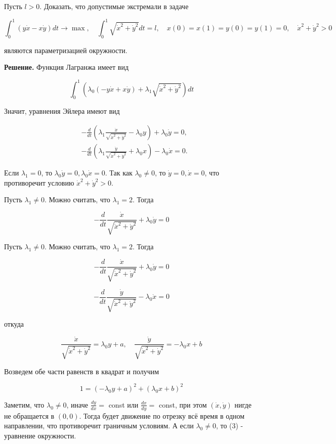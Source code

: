 \begin{task}
Пусть $l>0$. Доказать, что допустимые экстремали в задаче

$$
\int_{0}^{1}(y \dot{x}-x \dot{y}) d t \rightarrow \max , \quad \int_{0}^{1} \sqrt{\dot{x}^{2}+\dot{y}^{2}} d t=l, \quad x(0)=x(1)=y(0)=y(1)=0, \quad \dot{x}^{2}+\dot{y}^{2}>0
$$

являются параметризацией окружности.

\textbf{Решение.} Функция Лагранжа имеет вид

$$
\int_{0}^{1}\left(\lambda_{0}(-y \dot{x}+x \dot{y})+\lambda_{1} \sqrt{\dot{x}^{2}+\dot{y}^{2}}\right) d t
$$

Значит, уравнения Эйлера имеют вид

$$
\begin{aligned}
& -\frac{d}{d t}\left(\lambda_{1} \frac{\dot{x}}{\sqrt{\dot{x}^{2}+\dot{y}^{2}}}-\lambda_{0} y\right)+\lambda_{0} \dot{y}=0, \\
& -\frac{d}{d t}\left(\lambda_{1} \frac{\dot{y}}{\sqrt{\dot{x}^{2}+\dot{y}^{2}}}+\lambda_{0} x\right)-\lambda_{0} \dot{x}=0 .
\end{aligned}
$$

Если $\lambda_{1}=0$, то $\lambda_{0} \dot{y}=0, \lambda_{0} \dot{x}=0$. Так как $\lambda_{0} \neq 0$, то $\dot{y}=0, \dot{x}=0$, что противоречит условию $\dot{x}^{2}+\dot{y}^{2}>0$.

Пусть $\lambda_{1} \neq 0$. Можно считать, что $\lambda_{1}=2$. Тогда

$$
-\frac{d}{d t} \frac{\dot{x}}{\sqrt{\dot{x}^{2}+\dot{y}^{2}}}+\lambda_{0} \dot{y}=0
$$

Пусть $\lambda_{1} \neq 0$. Можно считать, что $\lambda_{1}=2$. Тогда

$$
-\frac{d}{d t} \frac{\dot{x}}{\sqrt{\dot{x}^{2}+\dot{y}^{2}}}+\lambda_{0} \dot{y}=0
$$

$$
-\frac{d}{d t} \frac{\dot{y}}{\sqrt{\dot{x}^{2}+\dot{y}^{2}}}-\lambda_{0} \dot{x}=0
$$

откуда

$$
\frac{\dot{x}}{\sqrt{\dot{x}^{2}+\dot{y}^{2}}}=\lambda_{0} y+a, \quad \frac{\dot{y}}{\sqrt{\dot{x}^{2}+\dot{y}^{2}}}=-\lambda_{0} x+b
$$

Возведем обе части равенств в квадрат и получим

$$
1=\left(-\lambda_{0} y+a\right)^{2}+\left(\lambda_{0} x+b\right)^{2}
$$

Заметим, что $\lambda_{0} \neq 0$, иначе $\frac{d y}{d x}=$ const или $\frac{d x}{d y}=$ const, при этом $(\dot{x}, \dot{y})$ нигде не обращается в $(0,0)$. Тогда будет движение по отрезку всё время в одном направлении, что противоречит граничным условиям. А если $\lambda_{0} \neq 0$, то (3) - уравнение окружности.
\end{task}